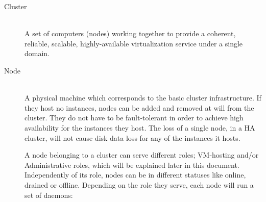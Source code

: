 \begin{description}
  \item[Cluster] \hfill \\
    A set of computers (nodes) working together to provide a coherent, reliable,
    scalable, highly-available virtualization service under a single domain.
  \item[Node] \hfill \\
    A physical machine which corresponds to the basic cluster infrastructure. If
    they host no instances, nodes can be added and removed at will from the
    cluster. They do not have to be fault-tolerant in order to achieve
    high availability for the instances they host. The loss of a single node,
    in a HA cluster, will not cause disk data loss for any of the instances it
    hosts.

    A node belonging to a cluster can serve different roles; VM-hosting and/or
    Administrative roles, which will be explained later in this document.
    Independently of its role, nodes can be in different statuses like online,
    drained or offline. Depending on the role they serve, each node will run a
    set of daemons:


\end{description}
